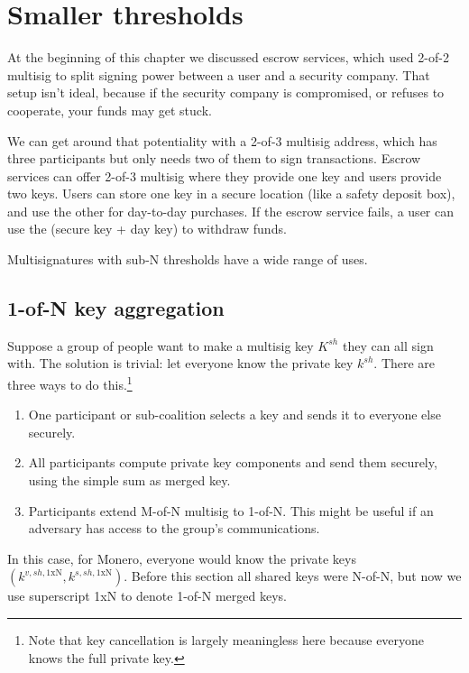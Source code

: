     
\section{Smaller thresholds}
\label{sec:smaller-thresholds}

At the beginning of this chapter we discussed escrow services, which used 2-of-2 multisig to split signing power between a user and a security company. That setup isn't ideal, because if the security company is compromised, or refuses to cooperate, your funds may get stuck.

We can get around that potentiality with a 2-of-3 multisig address, which has three participants but only needs two of them to sign transactions. Escrow services can offer 2-of-3 multisig where they provide one key and users provide two keys. Users can store one key in a secure location (like a safety deposit box), and use the other for day-to-day purchases. If the escrow service fails, a user can use the (secure key + day key) to withdraw funds.

Multisignatures with sub-N thresholds have a wide range of uses.


\subsection{1-of-N key aggregation}
\label{sec:1-of-n}

Suppose a group of people want to make a multisig key $K^{sh}$ they can all sign with. The solution is trivial: let everyone know the private key $k^{sh}$. There are three ways to do this.\footnote{Note that key cancellation is largely meaningless here because everyone knows the full private key.}

\begin{enumerate}
    \item One participant or sub-coalition selects a key and sends it to everyone else securely.
    \item All participants compute private key components and send them securely, using the simple sum as merged key.
    \item Participants extend M-of-N multisig to 1-of-N. This might be useful if an adversary has access to the group's communications.
\end{enumerate}

In this case, for Monero, everyone would know the private keys $(k^{v,sh,{1\textrm{xN}}},k^{s,sh,{1\textrm{xN}}})$. Before this section all shared keys were N-of-N, but now we use superscript 1xN to denote 1-of-N merged keys.


